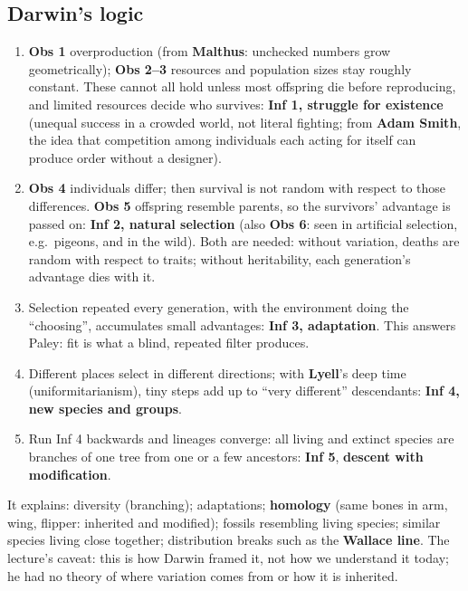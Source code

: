 \subsection{Darwin's logic}
\begin{chain}
\begin{enumerate}
\item \textbf{Obs 1} overproduction (from \textbf{Malthus}: unchecked numbers grow geometrically); \textbf{Obs 2--3}
resources and population sizes stay roughly constant. These cannot all hold unless most offspring die before
reproducing, and limited resources decide who survives: \textbf{Inf 1, struggle for existence} (unequal success in a
crowded world, not literal fighting; from \textbf{Adam Smith}, the idea that competition among individuals each acting
for itself can produce order without a designer).
\item \textbf{Obs 4} individuals differ; then survival is not random with respect to those differences. \textbf{Obs 5}
offspring resemble parents, so the survivors' advantage is passed on: \textbf{Inf 2, natural selection} (also
\textbf{Obs 6}: seen in artificial selection, e.g.\ pigeons, and in the wild). Both are needed: without variation,
deaths are random with respect to traits; without heritability, each generation's advantage dies with it.
\item Selection repeated every generation, with the environment doing the ``choosing'', accumulates small advantages:
\textbf{Inf 3, adaptation}. This answers Paley: fit is what a blind, repeated filter produces.
\item Different places select in different directions; with \textbf{Lyell}'s deep time (uniformitarianism), tiny steps
add up to ``very different'' descendants: \textbf{Inf 4, new species and groups}.
\item Run Inf 4 backwards and lineages converge: all living and extinct species are branches of one tree from one or a few
ancestors: \textbf{Inf 5}, \textbf{descent with modification}.
\end{enumerate}
\end{chain}
It explains: diversity (branching); adaptations; \textbf{homology} (same bones in arm, wing, flipper: inherited and
modified); fossils resembling living species; similar species living close together; distribution breaks such as the
\textbf{Wallace line}. The lecture's caveat: this is how Darwin framed it, not how we understand it today; he had no theory
of where variation comes from or how it is inherited.

